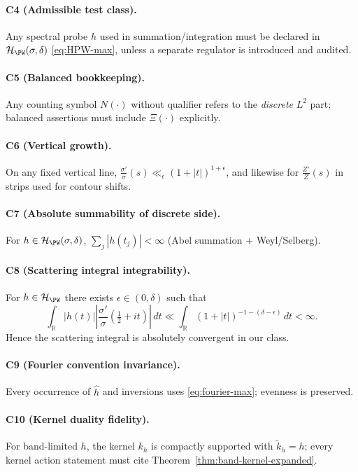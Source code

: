\paragraph{C4 (Admissible test class).}
Any spectral probe $h$ used in summation/integration must be declared in $\mathcal H_{\PW}(\sigma,\delta)$ \eqref{eq:HPW-max}, unless a separate regulator is introduced and audited.

\paragraph{C5 (Balanced bookkeeping).}
Any counting symbol $N(\cdot)$ without qualifier refers to the \emph{discrete} $L^2$ part; balanced assertions must include $\Xi(\cdot)$ explicitly.

\paragraph{C6 (Vertical growth).}
On any fixed vertical line, $\frac{\sigma'}{\sigma}(s)\ll_\epsilon (1+|t|)^{1+\epsilon}$, and likewise for $\frac{Z'}{Z}(s)$ in strips used for contour shifts.

\paragraph{C7 (Absolute summability of discrete side).}
For $h\in\mathcal H_{\PW}(\sigma,\delta)$, $\sum_j|h(t_j)|<\infty$ (Abel summation + Weyl/Selberg).

\paragraph{C8 (Scattering integral integrability).}
For $h\in\mathcal H_{\PW}$ there exists $\epsilon\in(0,\delta)$ such that
\[
\int_{\mathbb R}|h(t)|\left|\frac{\sigma'}{\sigma}(\tfrac12+it)\right|\,dt\ll \int_{\mathbb R}(1+|t|)^{-1-(\delta-\epsilon)}\,dt<\infty.
\]
Hence the scattering integral is absolutely convergent in our class.

\paragraph{C9 (Fourier convention invariance).}
Every occurrence of $\hat h$ and inversions uses \eqref{eq:fourier-max}; evenness is preserved.

\paragraph{C10 (Kernel duality fidelity).}
For band-limited $h$, the kernel $k_h$ is compactly supported with $\widetilde k_h=h$; every kernel action statement must cite Theorem~\ref{thm:band-kernel-expanded}.

